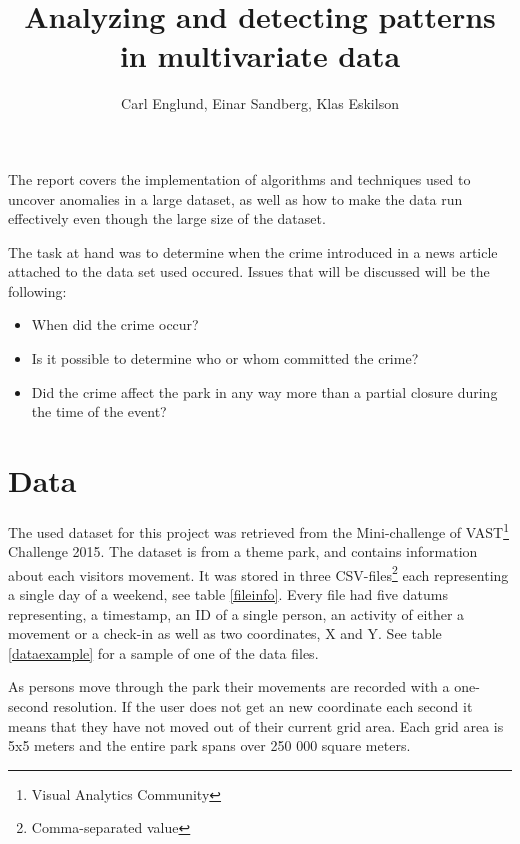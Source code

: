 \documentclass[journal]{vgtc}                %
\title{Analyzing and detecting patterns in multivariate data}
\author{Carl Englund, Einar Sandberg, Klas Eskilson}
\begin{document}


\maketitle The report covers the implementation of algorithms and techniques used to uncover anomalies in a large dataset, as well as how to make the data run effectively even though the large size of the dataset.

The task at hand was to determine when the crime introduced in a news article attached to the data set used occured. Issues that will be discussed will be the following:
\begin{itemize}
	\item When did the crime occur?
	\item Is it possible to determine who or whom committed the crime?
	\item Did the crime affect the park in any way more than a partial closure during the time of the event?
\end{itemize}

\section{Data}
The used dataset for this project was retrieved from the Mini-challenge of VAST\footnote{Visual Analytics Community} Challenge 2015. The dataset is from a theme park, and contains information about each visitors movement. It was stored in three CSV-files\footnote{Comma-separated value} each representing a single day of a weekend, see table \ref{fileinfo}. Every file had five datums representing, a timestamp,  an ID of a single person, an activity of either a movement or a check-in as well as two coordinates, X and Y. See table \ref{dataexample} for a sample of one of the data files.

As persons move through the park their movements are recorded with a one-second resolution. If the user does not get an new coordinate each second it means that they have not moved out of their current grid area. Each grid area is 5x5 meters and the entire park spans over 250 000 square meters.
\end{document}
